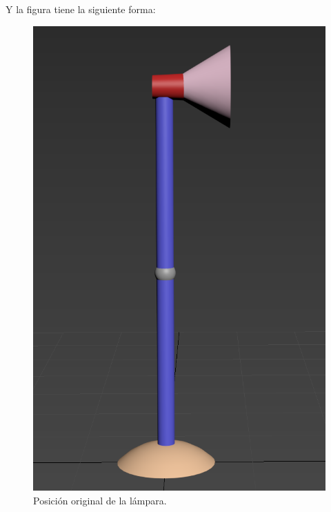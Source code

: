 \documentclass{article}
\begin{document}
Y la figura tiene la siguiente forma:


\begin{figure}[H]
    \centering
    \includegraphics[width=\textwidth]{imagenes/lamp1.png}
    \caption{Posición original de la lámpara.}
 \end{figure}    
\end{document}
